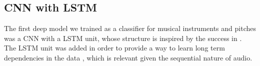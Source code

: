 \documentclass[runningheads,a4paper]{llncs}
\begin{document}


\subsection{CNN with LSTM}

The first deep model we trained as a classifier for musical instruments and pitches was a CNN with a LSTM unit, whose structure is inspired by the success in \cite{Salamon17}. The LSTM unit was added in order to provide a way to learn long term dependencies in the data \cite{Hochreiter97}, which is relevant given the sequential nature of audio.

\end{document}
